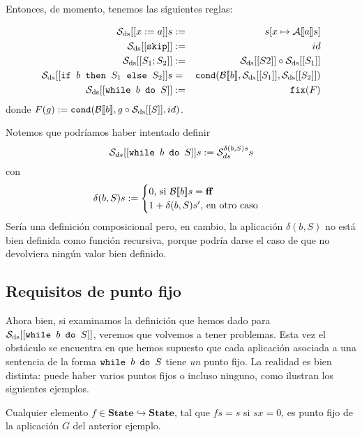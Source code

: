 Entonces, de momento, tenemos las siguientes reglas: 

\begin{sist*}[$\nn{While}_\nn{ds}$]\label{whileds}
\begin{eqnarray*}
    \mathcal{S}_{\mathrm{ds}} [[x:=a]]s &:=& s[x\mapsto \mathcal{A}[\![a]\!]s] \\
    \mathcal{S}_{\mathrm{ds}} [[\texttt{skip}]] &:=& id \\
    \mathcal{S}_{\mathrm{ds}} [[S_1;S_2]] &:=& \mathcal{S}_{\mathrm{ds}} [[S2]] \circ \mathcal{S}_{\mathrm{ds}} [[S_1]] \\
    \mathcal{S}_{\mathrm{ds}} [[\texttt{if } b\texttt{ then } S_1\texttt{ else } S_2]]s &=&  \texttt{cond}(\mathcal{B}[\![b]\!], \mathcal{S}_{\mathrm{ds}} [[S_1]], \mathcal{S}_{\mathrm{ds}} [[S_2]])\\
    \mathcal{S}_{\mathrm{ds}} [[\texttt{while } b \texttt{ do } S]] &:=&  \texttt{fix}(F)\\
\end{eqnarray*}
donde $F(g) := \texttt{cond}(\mathcal{B}[\![b]\!], g\circ \mathcal{S}_{\mathrm{ds}}[[S]], id)$.
\end{sist*}

Notemos que podríamos haber intentado definir 
$$\mathcal{S}_{ds}[[\texttt{while } b \texttt{ do } S]]s := \mathcal{S}_{ds}^{\delta(b, S)s}s$$
con 
$$\delta(b, S)s := \begin{cases}
    0 \text{, si } \mathcal{B}[\![b]\!]s = \mathbf{ff} \\
    1 + \delta(b, S)s' \text{, en otro caso}
\end{cases}$$
Sería una definición composicional pero, en cambio, la aplicación $\delta(b, S)$ no está bien definida como función recursiva, porque podría darse el caso de que no devolviera ningún valor bien definido.

\subsection{Requisitos de punto fijo}

Ahora bien, si examinamos la definición que hemos dado para $\mathcal{S}_{\mathrm{ds}} [[\texttt{while } b \texttt{ do } S]]$, veremos que volvemos a tener problemas. Esta vez el obstáculo se encuentra en que hemos supuesto que cada aplicación asociada a una sentencia de la forma $\texttt{while } b \texttt{ do } S$ tiene \textit{un} punto fijo. La realidad es bien distinta: puede haber varios puntos fijos o incluso ninguno, como ilustran los siguientes ejemplos.

\begin{example}
Cualquier elemento $f \in  \mathbf{State}\hookrightarrow \mathbf{State}$, tal que $fs =s$ si $sx = 0$, es punto fijo de la aplicación $G$ del anterior ejemplo.
\end{example}

